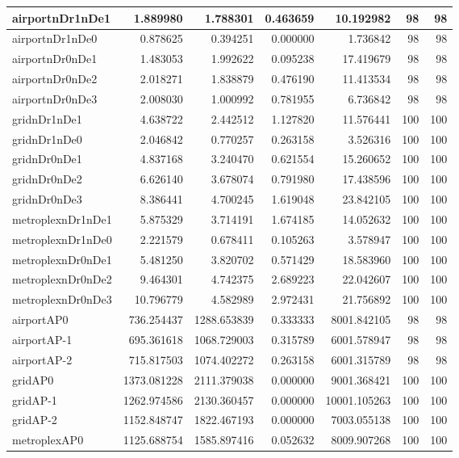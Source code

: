 \begin{longtable}{|l|r|r|r|r|r|r|}
\endlastfoot
airportnDr1nDe1 & 1.889980 & 1.788301 & 0.463659 & 10.192982 & 98 & 98 \\ \hline
airportnDr1nDe0 & 0.878625 & 0.394251 & 0.000000 & 1.736842 & 98 & 98 \\ \hline
airportnDr0nDe1 & 1.483053 & 1.992622 & 0.095238 & 17.419679 & 98 & 98 \\ \hline
airportnDr0nDe2 & 2.018271 & 1.838879 & 0.476190 & 11.413534 & 98 & 98 \\ \hline
airportnDr0nDe3 & 2.008030 & 1.000992 & 0.781955 & 6.736842 & 98 & 98 \\ \hline
gridnDr1nDe1 & 4.638722 & 2.442512 & 1.127820 & 11.576441 & 100 & 100 \\ \hline
gridnDr1nDe0 & 2.046842 & 0.770257 & 0.263158 & 3.526316 & 100 & 100 \\ \hline
gridnDr0nDe1 & 4.837168 & 3.240470 & 0.621554 & 15.260652 & 100 & 100 \\ \hline
gridnDr0nDe2 & 6.626140 & 3.678074 & 0.791980 & 17.438596 & 100 & 100 \\ \hline
gridnDr0nDe3 & 8.386441 & 4.700245 & 1.619048 & 23.842105 & 100 & 100 \\ \hline
metroplexnDr1nDe1 & 5.875329 & 3.714191 & 1.674185 & 14.052632 & 100 & 100 \\ \hline
metroplexnDr1nDe0 & 2.221579 & 0.678411 & 0.105263 & 3.578947 & 100 & 100 \\ \hline
metroplexnDr0nDe1 & 5.481250 & 3.820702 & 0.571429 & 18.583960 & 100 & 100 \\ \hline
metroplexnDr0nDe2 & 9.464301 & 4.742375 & 2.689223 & 22.042607 & 100 & 100 \\ \hline
metroplexnDr0nDe3 & 10.796779 & 4.582989 & 2.972431 & 21.756892 & 100 & 100 \\ \hline
airportAP0 & 736.254437 & 1288.653839 & 0.333333 & 8001.842105 & 98 & 98 \\ \hline
airportAP-1 & 695.361618 & 1068.729003 & 0.315789 & 6001.578947 & 98 & 98 \\ \hline
airportAP-2 & 715.817503 & 1074.402272 & 0.263158 & 6001.315789 & 98 & 98 \\ \hline
gridAP0 & 1373.081228 & 2111.379038 & 0.000000 & 9001.368421 & 100 & 100 \\ \hline
gridAP-1 & 1262.974586 & 2130.360457 & 0.000000 & 10001.105263 & 100 & 100 \\ \hline
gridAP-2 & 1152.848747 & 1822.467193 & 0.000000 & 7003.055138 & 100 & 100 \\ \hline
metroplexAP0 & 1125.688754 & 1585.897416 & 0.052632 & 8009.907268 & 100 & 100 \\ \hline

\end{longtable}
